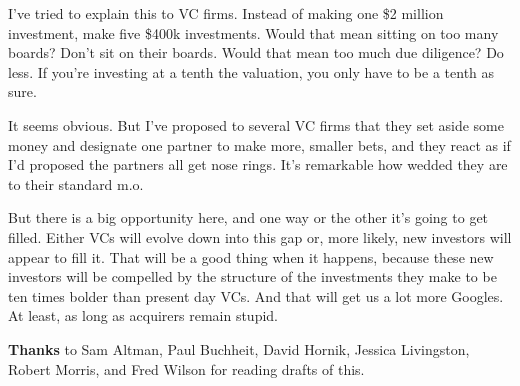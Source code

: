 I've tried to explain this to VC firms. Instead of making one \$2
million investment, make five \$400k investments. Would that mean
sitting on too many boards? Don't sit on their boards. Would that mean
too much due diligence? Do less. If you're investing at a tenth the
valuation, you only have to be a tenth as sure.

It seems obvious. But I've proposed to several VC firms that they set
aside some money and designate one partner to make more, smaller bets,
and they react as if I'd proposed the partners all get nose rings. It's
remarkable how wedded they are to their standard m.o.

But there is a big opportunity here, and one way or the other it's going
to get filled. Either VCs will evolve down into this gap or, more
likely, new investors will appear to fill it. That will be a good thing
when it happens, because these new investors will be compelled by the
structure of the investments they make to be ten times bolder than
present day VCs. And that will get us a lot more Googles. At least, as
long as acquirers remain stupid.


\textbf{Thanks} to Sam Altman, Paul Buchheit, David Hornik, Jessica
Livingston, Robert Morris, and Fred Wilson for reading drafts of this.